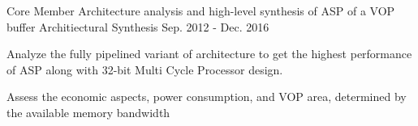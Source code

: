 \begin{cventries}
 \cventry
    {Core Member} %
    {Architecture analysis and high-level synthesis of ASP of a VOP buffer} %
    {Architiectural Synthesis} %
    {Sep. 2012 - Dec. 2016} %
    {
      \begin{cvitems} %
        \item {Analyze the fully pipelined variant of architecture to get the highest performance of ASP along with 32-bit Multi Cycle Processor design.}
        \item {Assess the economic aspects, power consumption, and VOP area, determined by the available memory
			bandwidth}
      \end{cvitems}
    }
\fi
\end{cventries}
